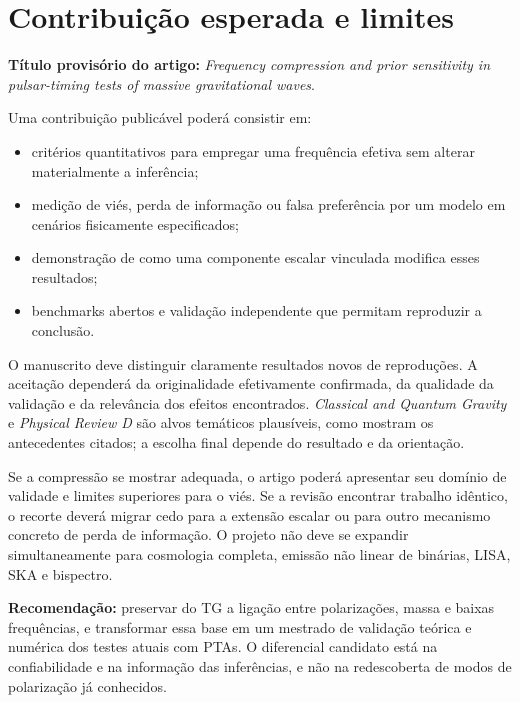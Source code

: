 \chapter{Contribuição esperada e limites}\label{produto-publicuxe1vel-e-limites-de-escopo}

\textbf{Título provisório do artigo:} \emph{Frequency compression and
prior sensitivity in pulsar-timing tests of massive gravitational
waves}.

Uma contribuição publicável poderá consistir em:

\begin{itemize}
\tightlist
\item
  critérios quantitativos para empregar uma frequência efetiva sem
  alterar materialmente a inferência;
\item
  medição de viés, perda de informação ou falsa preferência por um
  modelo em cenários fisicamente especificados;
\item
  demonstração de como uma componente escalar vinculada modifica esses
  resultados;
\item
  benchmarks abertos e validação independente que permitam reproduzir a
  conclusão.
\end{itemize}

O manuscrito deve distinguir claramente resultados novos de reproduções.
A aceitação dependerá da originalidade efetivamente confirmada, da
qualidade da validação e da relevância dos efeitos encontrados.
\emph{Classical and Quantum Gravity} e \emph{Physical Review D} são
alvos temáticos plausíveis, como mostram os antecedentes citados; a
escolha final depende do resultado e da orientação.

Se a compressão se mostrar adequada, o artigo poderá apresentar seu
domínio de validade e limites superiores para o viés. Se a revisão
encontrar trabalho idêntico, o recorte deverá migrar cedo para a
extensão escalar ou para outro mecanismo concreto de perda de
informação. O projeto não deve se expandir simultaneamente para
cosmologia completa, emissão não linear de binárias, LISA, SKA e
bispectro.

\textbf{Recomendação:} preservar do TG a ligação entre polarizações,
massa e baixas frequências, e transformar essa base em um mestrado de
validação teórica e numérica dos testes atuais com PTAs. O diferencial
candidato está na confiabilidade e na informação das inferências, e não
na redescoberta de modos de polarização já conhecidos.
